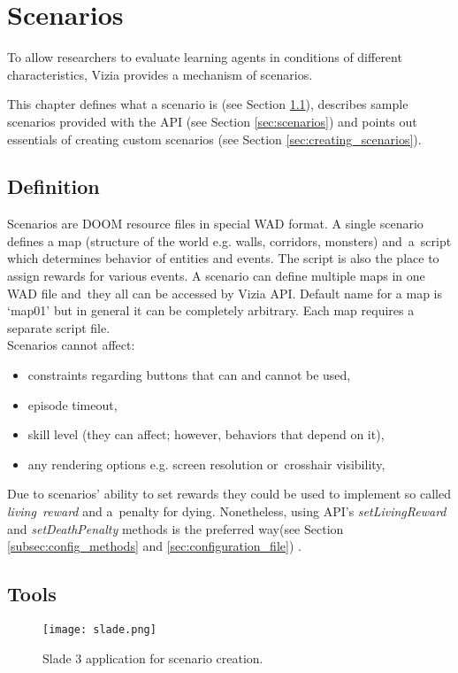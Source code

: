 \chapter{Scenarios}\label{ch:scenarios}

To allow researchers to evaluate learning agents in conditions of different characteristics, Vizia provides a mechanism of scenarios.

This chapter defines what a scenario is (see Section \ref{sec:scenario_definition}), describes sample scenarios provided with the API (see Section \ref{sec:scenarios}) and points out essentials of creating custom scenarios (see Section \ref{sec:creating_scenarios}).

\section{Definition}\label{sec:scenario_definition}
	Scenarios are DOOM resource files in special WAD format. A single scenario defines a map (structure of the world e.g. walls, corridors, monsters) and~a~script which determines behavior of entities and events. The script is also the place to assign rewards for various events. A scenario can define multiple maps in one WAD file and~they all can be accessed by Vizia API. Default name for a map is `map01' but in general it can be completely arbitrary. Each map requires a separate script file.
	\\
	Scenarios cannot affect:
	\begin{itemize}
		\item constraints regarding buttons that can and cannot be used,
		\item episode timeout,
		\item skill level (they can affect; however, behaviors that depend on it),
		\item any rendering options e.g. screen resolution or~crosshair visibility,
	\end{itemize}

	Due to scenarios' ability to set rewards they could be used to implement so called \emph{living~reward} and a~penalty for dying. Nonetheless, using API's \emph{setLivingReward} and \emph{setDeathPenalty} methods is the preferred way(see Section \ref{subsec:config_methods} and \ref{sec:configuration_file}) .

\section{Tools}\label{sec:tools}
	\begin{figure}
			\centering
			\texttt{[image: slade.png]}
			\caption{Slade 3 application for scenario creation.}\label{fig:slade}
	\end{figure}

